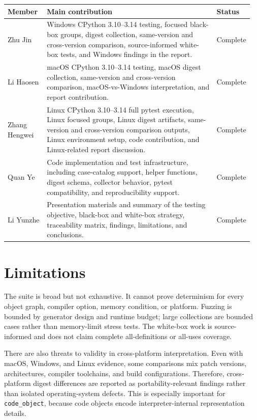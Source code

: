 \documentclass[10pt,a4paper]{article}
\begin{document}
\begin{longtable}{@{}L{0.16\linewidth}L{0.70\linewidth}L{0.10\linewidth}@{}}
\toprule
\textbf{Member} & \textbf{Main contribution} & \textbf{Status} \\
\midrule

Zhu Jin &
Windows CPython 3.10--3.14 testing, focused black-box groups, digest collection, same-version and cross-version comparison, source-informed white-box tests, and Windows findings in the report. &
Complete \\

Li Haosen &
macOS CPython 3.10--3.14 testing, macOS digest collection, same-version and cross-version comparison, macOS-vs-Windows interpretation, and report contribution. &
Complete \\

Zhang Hengwei &
Linux CPython 3.10--3.14 full pytest execution, Linux focused groups, Linux digest artifacts, same-version and cross-version comparison outputs, Linux environment setup, code contribution, and Linux-related report discussion. &
Complete \\

Quan Ye &
Code implementation and test infrastructure, including case-catalog support, helper functions, digest schema, collector behavior, pytest compatibility, and reproducibility support. &
Complete \\

Li Yunzhe &
Presentation materials and summary of the testing objective, black-box and white-box strategy, traceability matrix, findings, limitations, and conclusions. &
Complete \\

\bottomrule
\end{longtable}
\endgroup

\section{Limitations}

The suite is broad but not exhaustive. It cannot prove determinism for every object graph, compiler option, memory condition, or platform. Fuzzing is bounded by generator design and runtime budget; large collections are bounded cases rather than memory-limit stress tests. The white-box work is source-informed and does not claim complete all-definitions or all-uses coverage.

There are also threats to validity in cross-platform interpretation. Even with macOS, Windows, and Linux evidence, some comparisons mix patch versions, architectures, compiler toolchains, and build configurations. Therefore, cross-platform digest differences are reported as portability-relevant findings rather than isolated operating-system defects. This is especially important for \texttt{code\_object}, because code objects encode interpreter-internal representation details.
\end{document}
